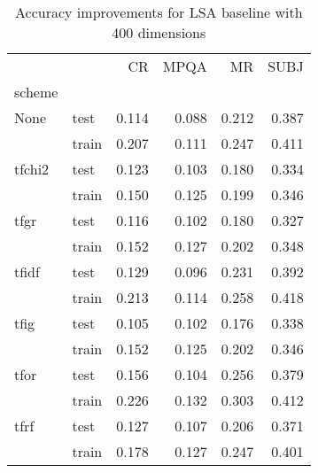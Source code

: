 \begin{table}[h]
\begin{center}

\begin{tabular}{llrrrr}
\toprule
{} &      &  CR &  MPQA &  MR &  SUBJ \\
scheme &  &            &              &            &              \\
\midrule
None & test &      0.114 &        0.088 &      0.212 &        0.387 \\
{} & train &      0.207 &        0.111 &      0.247 &        0.411 \\
tfchi2 & test &      0.123 &        0.103 &      0.180 &        0.334 \\
{} & train &      0.150 &        0.125 &      0.199 &        0.346 \\
tfgr & test &      0.116 &        0.102 &      0.180 &        0.327 \\
{} & train &      0.152 &        0.127 &      0.202 &        0.348 \\
tfidf & test &      0.129 &        0.096 &      0.231 &        0.392 \\
{} & train &      0.213 &        0.114 &      0.258 &        0.418 \\
tfig & test &      0.105 &        0.102 &      0.176 &        0.338 \\
{} & train &      0.152 &        0.125 &      0.202 &        0.346 \\
tfor & test &      0.156 &        0.104 &      0.256 &        0.379 \\
{} & train &      0.226 &        0.132 &      0.303 &        0.412 \\
tfrf & test &      0.127 &        0.107 &      0.206 &        0.371 \\
{} & train &      0.178 &        0.127 &      0.247 &        0.401 \\
\bottomrule
\end{tabular}

\caption[Accuracy improvements for LSA baseline with 400 dimensions]{Accuracy improvements for LSA baseline with 400 dimensions}
\label{tab:lsa:resuts:400}
\end{center}
\end{table}







